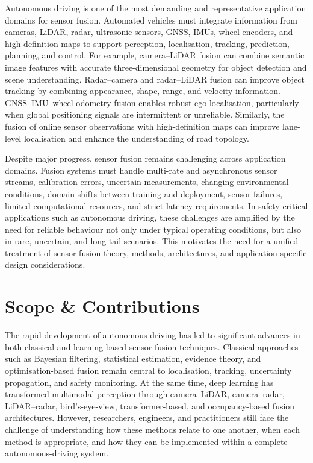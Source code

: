 \documentclass[graybox,envcountchap]{style/SNmono}
\begin{document}
Autonomous driving is one of the most demanding and representative application domains for sensor fusion. Automated vehicles must integrate information from cameras, LiDAR, radar, ultrasonic sensors, GNSS, IMUs, wheel encoders, and high-definition maps to support perception, localisation, tracking, prediction, planning, and control. For example, camera--LiDAR fusion can combine semantic image features with accurate three-dimensional geometry for object detection and scene understanding. Radar--camera and radar--LiDAR fusion can improve object tracking by combining appearance, shape, range, and velocity information. GNSS--IMU--wheel odometry fusion enables robust ego-localisation, particularly when global positioning signals are intermittent or unreliable. Similarly, the fusion of online sensor observations with high-definition maps can improve lane-level localisation and enhance the understanding of road topology.

Despite major progress, sensor fusion remains challenging across application domains. Fusion systems must handle multi-rate and asynchronous sensor streams, calibration errors, uncertain measurements, changing environmental conditions, domain shifts between training and deployment, sensor failures, limited computational resources, and strict latency requirements. In safety-critical applications such as autonomous driving, these challenges are amplified by the need for reliable behaviour not only under typical operating conditions, but also in rare, uncertain, and long-tail scenarios. This motivates the need for a unified treatment of sensor fusion theory, methods, architectures, and application-specific design considerations.

\section{Scope \& Contributions}

The rapid development of autonomous driving has led to significant advances in both classical and learning-based sensor fusion techniques. Classical approaches such as Bayesian filtering, statistical estimation, evidence theory, and optimisation-based fusion remain central to localisation, tracking, uncertainty propagation, and safety monitoring. At the same time, deep learning has transformed multimodal perception through camera--LiDAR, camera--radar, LiDAR--radar, bird's-eye-view, transformer-based, and occupancy-based fusion architectures. However, researchers, engineers, and practitioners still face the challenge of understanding how these methods relate to one another, when each method is appropriate, and how they can be implemented within a complete autonomous-driving system.
\end{document}
